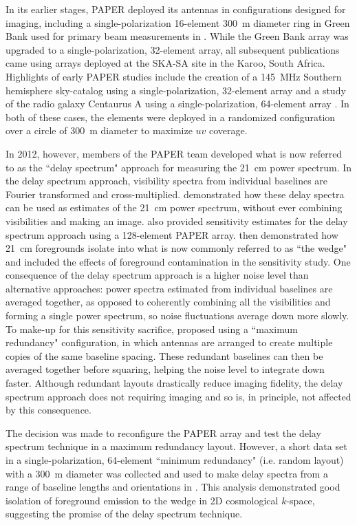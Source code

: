 In its earlier stages, PAPER deployed its antennas in configurations designed for imaging, including a single-polarization 16-element 300~m diameter ring in Green Bank used for primary beam measurements in \cite{pober12}.  While the Green Bank array was upgraded to a single-polarization, 32-element array, all subsequent publications came using arrays deployed at the SKA-SA site in the Karoo, South Africa.  Highlights of early PAPER studies include the creation of a 145\, MHz Southern hemisphere sky-catalog using a single-polarization, 32-element array \cite{jacobs10} and a study of the radio galaxy Centaurus A using a single-polarization, 64-element array \cite{stefan10}.  In both of these cases, the elements were deployed in a randomized configuration over a circle of 300~m diameter to maximize $uv$ coverage.

In 2012, however, members of the PAPER team developed what is now referred to as the ``delay spectrum" approach for measuring the 21~cm power spectrum.  In the delay spectrum approach, visibility spectra from individual baselines are Fourier transformed and cross-multiplied. \cite{parsons12a} demonstrated how these delay spectra can be used as estimates of the 21~cm power spectrum, without ever combining visibilities and making an image.  \cite{parsons12a} also provided sensitivity estimates for the delay spectrum approach using a 128-element PAPER array.  \cite{parsons12b} then demonstrated how 21~cm foregrounds isolate into what is now commonly referred to as ``the wedge" and included the effects of foreground contamination in the sensitivity study.  One consequence of the delay spectrum approach is a higher noise level than alternative approaches: power spectra estimated from individual baselines are averaged together, as opposed to coherently combining all the visibilities and forming a single power spectrum, so noise fluctuations average down more slowly.  To make-up for this sensitivity sacrifice, \cite{parsons12a} proposed using a ``maximum redundancy" configuration, in which antennas are arranged to create multiple copies of the same baseline spacing.  These redundant baselines can then be averaged together before squaring, helping the noise level to integrate down faster.  Although redundant layouts drastically reduce imaging fidelity, the delay spectrum approach does not requiring imaging and so is, in principle, not affected by this consequence.

The decision was made to reconfigure the PAPER array and test the delay spectrum technique in a maximum redundancy layout. However, a short data set in a single-polarization, 64-element ``minimum redundancy" (i.e. random layout) with a 300~m diameter was collected and used to make delay spectra from a range of baseline lengths and orientations in \cite{pober13}.  This analysis demonstrated good isolation of foreground emission to the wedge in 2D cosmological $k$-space, suggesting the promise of the delay spectrum technique. 

